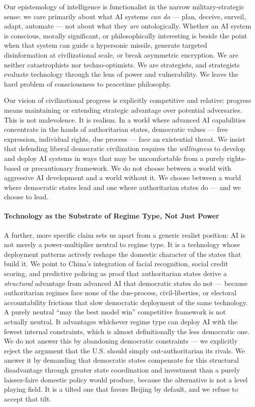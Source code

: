 Our epistemology of intelligence is functionalist in the narrow
military-strategic sense: we care primarily about what AI systems
\emph{can do} --- plan, deceive, surveil, adapt, automate --- not about
what they \emph{are} ontologically. Whether an AI system is conscious,
morally significant, or philosophically interesting is beside the point
when that system can guide a hypersonic missile, generate targeted
disinformation at civilizational scale, or break asymmetric encryption.
We are neither catastrophists nor techno-optimists. We are strategists,
and strategists evaluate technology through the lens of power and
vulnerability. We leave the hard problem of consciousness to peacetime
philosophy.

Our vision of civilizational progress is explicitly competitive and
relative: progress means maintaining or extending strategic advantage
over potential adversaries. This is not malevolence. It is realism. In a
world where advanced AI capabilities concentrate in the hands of
authoritarian states, democratic values --- free expression, individual
rights, due process --- face an existential threat. We insist that
defending liberal democratic civilization requires the
\emph{willingness} to develop and deploy AI systems in ways that may be
uncomfortable from a purely rights-based or precautionary framework. We
do not choose between a world with aggressive AI development and a world
without it. We choose between a world where democratic states lead and
one where authoritarian states do --- and we choose to lead.

\paragraph{Technology as the Substrate of Regime Type, Not Just
Power}\label{technology-as-the-substrate-of-regime-type-not-just-power}

A further, more specific claim sets us apart from a generic realist
position: AI is not merely a power-multiplier neutral to regime type. It
is a technology whose deployment patterns actively reshape the domestic
character of the states that build it. We point to China's integration
of facial recognition, social credit scoring, and predictive policing as
proof that authoritarian states derive a \emph{structural} advantage
from advanced AI that democratic states do not --- because authoritarian
regimes face none of the due-process, civil-liberties, or electoral
accountability frictions that slow democratic deployment of the same
technology. A purely neutral ``may the best model win'' competitive
framework is not actually neutral. It advantages whichever regime type
can deploy AI with the fewest internal constraints, which is almost
definitionally the less democratic one. We do not answer this by
abandoning democratic constraints --- we explicitly reject the argument
that the U.S. should simply out-authoritarian its rivals. We answer it
by demanding that democratic states compensate for this structural
disadvantage through greater state coordination and investment than a
purely laissez-faire domestic policy would produce, because the
alternative is not a level playing field. It is a tilted one that favors
Beijing by default, and we refuse to accept that tilt.

